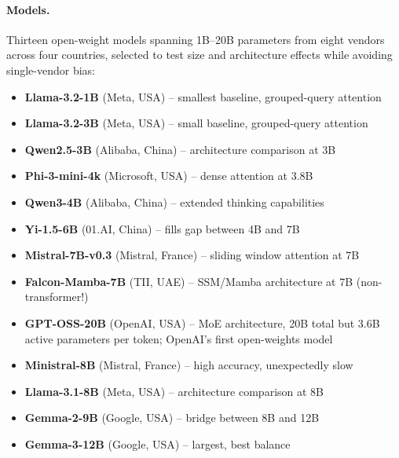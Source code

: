 \documentclass[11pt]{article}
\begin{document}
\paragraph{Models.}
Thirteen open-weight models spanning 1B--20B parameters from eight vendors across four countries, selected to test size and architecture effects while avoiding single-vendor bias:
\begin{itemize}[leftmargin=12pt]
    \item \textbf{Llama-3.2-1B} (Meta, USA) -- smallest baseline, grouped-query attention
    \item \textbf{Llama-3.2-3B} (Meta, USA) -- small baseline, grouped-query attention
    \item \textbf{Qwen2.5-3B} (Alibaba, China) -- architecture comparison at 3B
    \item \textbf{Phi-3-mini-4k} (Microsoft, USA) -- dense attention at 3.8B
    \item \textbf{Qwen3-4B} (Alibaba, China) -- extended thinking capabilities
    \item \textbf{Yi-1.5-6B} (01.AI, China) -- fills gap between 4B and 7B
    \item \textbf{Mistral-7B-v0.3} (Mistral, France) -- sliding window attention at 7B
    \item \textbf{Falcon-Mamba-7B} (TII, UAE) -- SSM/Mamba architecture at 7B (non-transformer!)
    \item \textbf{GPT-OSS-20B} (OpenAI, USA) -- MoE architecture, 20B total but 3.6B active parameters per token; OpenAI's first open-weights model
    \item \textbf{Ministral-8B} (Mistral, France) -- high accuracy, unexpectedly slow
    \item \textbf{Llama-3.1-8B} (Meta, USA) -- architecture comparison at 8B
    \item \textbf{Gemma-2-9B} (Google, USA) -- bridge between 8B and 12B
    \item \textbf{Gemma-3-12B} (Google, USA) -- largest, best balance
\end{itemize}
\end{document}
